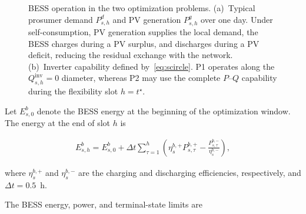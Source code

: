 \documentclass[journal]{IEEEtran}
\begin{document}
\begin{figure}[h!]

\caption{BESS operation in the two optimization problems. (a)~Typical prosumer demand \(P^{d}_{s,h}\) and PV generation \(P^{g}_{s,h}\) over one day. Under self-consumption, PV generation supplies the local demand, the BESS charges during a PV surplus, and discharges during a PV deficit, reducing the residual exchange with the network. (b)~Inverter capability defined by~\eqref{eq:scircle}. P1 operates along the \(Q^{\mathrm{inv}}_{s,h}=0\) diameter, whereas P2 may use the complete \(P\)--\(Q\) capability during the flexibility slot \(h=t^\star\).}
\label{fig:profiles}

\end{figure}

Let \(E^{b}_{s,0}\) denote the BESS energy at the beginning of the optimization window. The energy at the end of slot \(h\) is

\begin{equation}
\label{eq:soc_dynamics}
\begin{aligned}
E^{b}_{s,h}
=
E^{b}_{s,0}
+
\Delta t
\sum_{\tau=1}^{h}
\left(
\eta^{b,+}_{s}P^{b,+}_{s,\tau}
-
\frac{P^{b,-}_{s,\tau}}{\eta^{b,-}_{s}}
\right),
\end{aligned}
\end{equation}

where \(\eta^{b,+}_{s}\) and \(\eta^{b,-}_{s}\) are the charging and discharging efficiencies, respectively, and \(\Delta t=0.5\)~h.

The BESS energy, power, and terminal-state limits are
\end{document}
